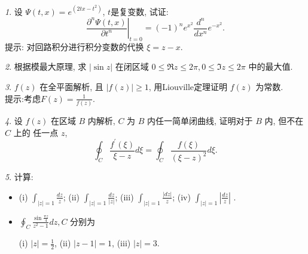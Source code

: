 \documentclass[11pt]{article}
\theoremstyle{remark}
\newtheorem{problem}{}
\begin{document}
\renewcommand{\labelenumi}{(\arabic{enumi})}
\renewcommand{\labelenumii}{(\arabic{enumi}.\arabic{enumii})}



 

\begin{problem}
  设 $\Psi(t, x)=e^{ \left(2 t x-t^2\right)}$, $t$是复变数, 试证: 
  $$
  \left.\frac{\partial^n \Psi(t, x)}{\partial t^n}\right|_{t=0}=(-1)^n e^{x^2} \frac{d^n}{d x^n} e^{-x^2}.
  $$
  提示: 对回路积分进行积分变数的代换 $\xi=z-x$.
\end{problem}

\begin{problem}
  根据模最大原理,
  求 $|\sin z|$ 在闭区域 $0 \leq \Re z \leq 2 \pi, 0 \leq \Im z \leq 2 \pi$ 中的最大值.
\end{problem}

\begin{problem}
  $f(z)$ 在全平面解析, 且 $|f(z)| \geq 1$, 用Liouville定理证明 $f(z)$ 为常数.
  \\
  提示:考虑$F(z) = \frac{1}{f(z)}$.
\end{problem}

\begin{problem}
  设 $f(z)$ 在区域 $B$ 内解析, $C$ 为 $B$ 内任一简单闭曲线, 证明对于 $B$ 内, 
  但不在 $C$ 上的 任一点 $z$, 
  $$
  \oint_C \frac{f^{\prime}(\xi)}{\xi-z} d \xi=\oint_C \frac{f(\xi)}{(\xi-z)^2} d \xi.
  $$ 
\end{problem}

\begin{problem}
  计算:
  \begin{itemize}
    \item 
    (i) $\int_{|z|=1} \frac{d z}{z}$;
    (ii) $\int_{|z|=1} \frac{d z}{|z|}$;
    (iii) $\int_{|z|=1} \frac{|d z|}{z}$;
    (iv) $\int_{|z|=1}\left|\frac{d z}{z}\right|$ .

    \item  $\oint_C \frac{\sin \frac{\pi z}{4}}{z^2-1} d z, C$ 分别为

    (i) $|z|=\frac{1}{2}$,
    (ii) $|z-1|=1$,
    (iii) $|z|=3$.
    
  \end{itemize}
\end{problem}
\end{document}
